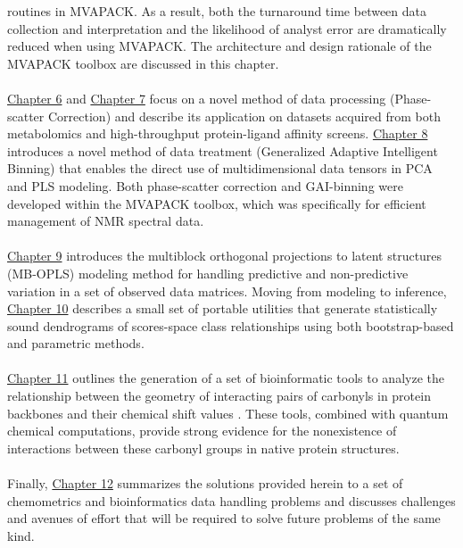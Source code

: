 \begin{doublespace}
routines in MVAPACK. As a result, both the turnaround time between data
collection and interpretation and the likelihood of analyst error are
dramatically reduced when using MVAPACK. The architecture and design rationale
of the MVAPACK toolbox are discussed in this chapter.
\\\\
\hyperlink{chapter.6}{Chapter 6} and \hyperlink{chapter.7}{Chapter 7} focus on
a novel method of data processing (Phase-scatter Correction) and describe its
application on datasets acquired from both metabolomics and high-throughput
protein-ligand affinity screens. \hyperlink{chapter.8}{Chapter 8} introduces
a novel method of data treatment (Generalized Adaptive Intelligent Binning)
that enables the direct use of multidimensional data tensors in PCA and PLS
modeling. Both phase-scatter correction and GAI-binning were developed within
the MVAPACK toolbox, which was specifically for efficient management of NMR
spectral data.
\\\\
\hyperlink{chapter.9}{Chapter 9} introduces the multiblock orthogonal
projections to latent structures (MB-OPLS) modeling method for handling
predictive and non-predictive variation in a set of observed data matrices.
Moving from modeling to inference, \hyperlink{chapter.10}{Chapter 10} describes
a small set of portable utilities that generate statistically sound dendrograms
of scores-space class relationships using both bootstrap-based and parametric
methods.
\\\\
\hyperlink{chapter.11}{Chapter 11} outlines the generation of a set of
bioinformatic tools to analyze the relationship between the geometry of
interacting pairs of carbonyls in protein backbones and their \cnmr{} chemical
shift values \cite{worley:pone2012}. These tools, combined with quantum
chemical computations, provide strong evidence for the nonexistence of
\npistar{} interactions between these carbonyl groups in native protein
structures.
\\\\
Finally, \hyperlink{chapter.12}{Chapter 12} summarizes the solutions provided
herein to a set of chemometrics and bioinformatics data handling problems and
discusses challenges and avenues of effort that will be required to solve
future problems of the same kind.
\end{doublespace}




